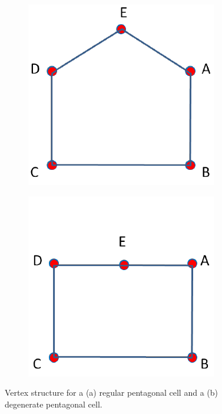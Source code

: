 \begin{figure}
\label{fig::2D_pentagon_vertices}
\centering
	\begin{subfigure}[b]{0.40\textwidth}
		\centering
		\includegraphics[width=\textwidth]{figures/sec_BF/reg_pent_verts.png}
		\caption{}
	\end{subfigure}
	\hfill
	\begin{subfigure}[b]{0.40\textwidth}
		\centering
		\includegraphics[width=\textwidth]{figures/sec_BF/deg_pent_verts.png}
		\caption{}
	\end{subfigure}
\caption{Vertex structure for a (a) regular pentagonal cell and a (b) degenerate pentagonal cell.}
\end{figure}

